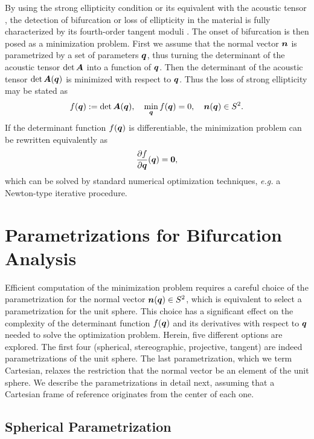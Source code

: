 \documentclass[12pt]{article}
\numberwithin{equation}{section}
\begin{document}
By using the strong ellipticity condition
 or its equivalent with the acoustic
tensor , the detection of bifurcation
or loss of ellipticity in the material is fully characterized by its
fourth-order tangent moduli . The
onset of bifurcation is then posed as a minimization problem.  First
we assume that the normal vector ${\boldsymbol{n}}$ is parametrized by a set of
parameters ${\boldsymbol{q}}$, thus turning the determinant of the acoustic tensor
$\det {\boldsymbol{A}}$ into a function of ${\boldsymbol{q}}$.  Then the determinant of the
acoustic tensor $\det {\boldsymbol{A}}({\boldsymbol{q}})$ is minimized with respect to
${\boldsymbol{q}}$. Thus the loss of strong ellipticity may be stated as
\begin{equation} \label{eq:minimization-determinant}
  f({\boldsymbol{q}}) := \det {\boldsymbol{A}}({\boldsymbol{q}}),
  \quad
  \min_{{\boldsymbol{q}}} f({\boldsymbol{q}}) = 0,
  \quad
  {\boldsymbol{n}}({\boldsymbol{q}}) \in S^2.
\end{equation}
If the determinant function $f({\boldsymbol{q}})$ is differentiable, the
minimization problem can be rewritten equivalently as
\begin{equation}\label{eq:minimization-derivative}
  \frac{\partial f}{\partial {\boldsymbol{q}}}({\boldsymbol{q}}) = \mathbf{0},
\end{equation}
which can be solved by standard numerical optimization techniques,
\emph{e.g.} a Newton-type iterative procedure.

\section{Parametrizations for Bifurcation Analysis}
\label{sec:parametrizations}

Efficient computation of the minimization problem
 requires a careful choice of the
parametrization for the normal vector ${\boldsymbol{n}}({\boldsymbol{q}}) \in S^2$, which is
equivalent to select a parametrization for the unit sphere. This
choice has a significant effect on the complexity of the determinant
function $f({\boldsymbol{q}})$ and its derivatives with respect to ${\boldsymbol{q}}$ needed to
solve the optimization problem. Herein, five different options are
explored. The first four (spherical, stereographic, projective,
tangent) are indeed parametrizations of the unit sphere.  The last
parametrization, which we term Cartesian, relaxes the restriction that
the normal vector be an element of the unit sphere. We describe the
parametrizations in detail next, assuming that a Cartesian frame of
reference originates from the center of each one.

\subsection{Spherical Parametrization}
\label{subsec:spherical}
\end{document}
